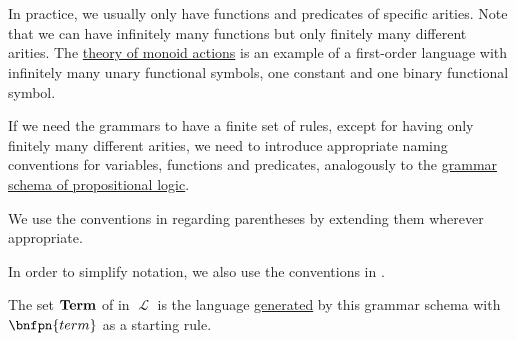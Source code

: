 \begin{definition}
\begin{thmenum}
\begin{bnf*}
       \\
      \bnfmore                  {\hspace{3cm} \vdots} \\
       \\
      \bnfmore                  {\hspace{3cm} \vdots} \\
               { \bnfor} \\
       \\
       \\
    \end{bnf*}

    In practice, we usually only have functions and predicates of specific arities. Note that we can have infinitely many functions but only finitely many different arities. The \hyperref[rem:theory_of_left_monoid_actions]{theory of monoid actions} is an example of a first-order language with infinitely many unary functional symbols, one constant and one binary functional symbol.

    If we need the grammars to have a finite set of rules, except for having only finitely many different arities, we need to introduce appropriate naming conventions for variables, functions and predicates, analogously to the \hyperref[def:propositional_syntax/grammar_schema]{grammar schema of propositional logic}.

    We use the conventions in  regarding parentheses by extending them wherever appropriate.

    In order to simplify notation, we also use the conventions in .

     The set \( \operatorname{\mathbf{Term}} \) of  in \( \mscrL \) is the language \hyperref[def:grammar_derivation/grammar_language]{generated} by this grammar schema with \( \bnfpn{term} \) as a starting rule.


\end{thmenum}
\end{definition}
